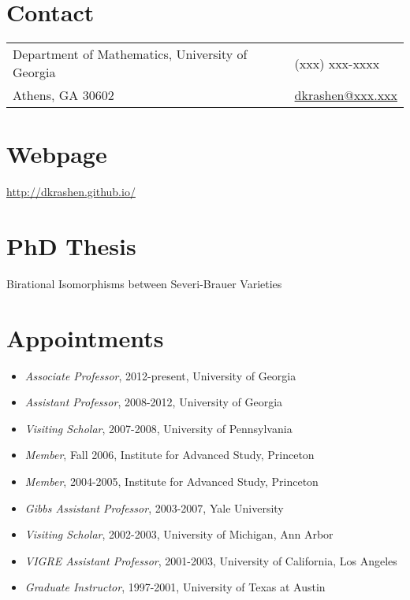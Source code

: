 \documentclass[10pt]{article}
\begin{document}
\newlength{\rcollength}\setlength{\rcollength}{1.85in}%

\section{Contact}  
\begin{tabular}[t]{@{}p{\textwidth-\rcollength}p{\rcollength}} 
Department of Mathematics, University of Georgia & (xxx) xxx-xxxx \\
Athens, GA 30602 & \href{mailto:dkrashen@xxx.xxx}{dkrashen@xxx.xxx} \\
\end{tabular}

\section{Webpage} 
\url{http://dkrashen.github.io/}




\section{PhD Thesis}
Birational Isomorphisms between Severi-Brauer Varieties

\section{Appointments}
\vspace*{-1.7\baselineskip}

\begin{itemize}[leftmargin=-.1cm]
\item[]
  \textit{Associate Professor}, 2012-present, University of Georgia
\item[]
  \textit{Assistant Professor}, 2008-2012, University of Georgia
\item[]
  \textit{Visiting Scholar}, 2007-2008, University of Pennsylvania
\item[]
  \textit{Member}, Fall 2006, Institute for Advanced Study, Princeton
\item[]
  \textit{Member}, 2004-2005, Institute for Advanced Study, Princeton
\item[]
  \textit{Gibbs Assistant Professor}, 2003-2007, Yale University
\item[]
  \textit{Visiting Scholar}, 2002-2003, University of Michigan, Ann Arbor
\item[]
  \textit{VIGRE Assistant Professor}, 2001-2003, University of California, Los Angeles
\item[]
  \textit{Graduate Instructor}, 1997-2001, University of Texas at Austin
\end{itemize}
\end{document}

